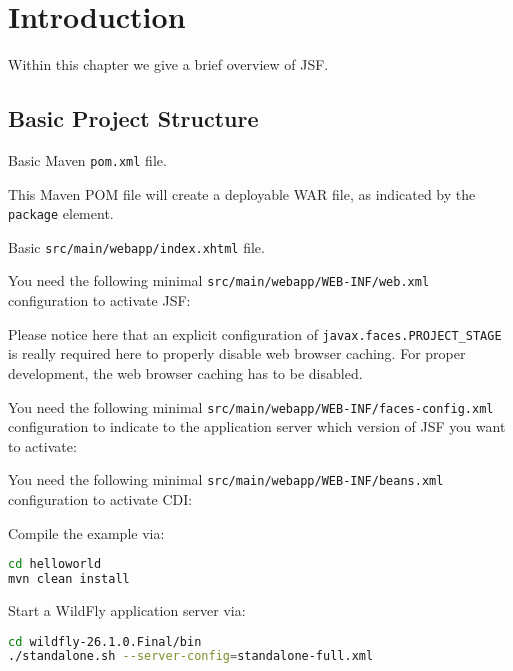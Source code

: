%

\chapter{Introduction}

Within this chapter we give a brief overview of JSF.

\section{Basic Project Structure}
Basic Maven \texttt{pom.xml} file.


This Maven POM file will create a deployable WAR file, as indicated by the \texttt{package} element.

Basic \texttt{src/main/webapp/index.xhtml} file.


You need the following minimal \texttt{src/main/webapp/WEB-INF/web.xml} configuration to activate JSF:


Please notice here that an explicit configuration of \texttt{javax.faces.PROJECT\_STAGE} is really required here to properly disable web browser caching.
For proper development, the web browser caching has to be disabled.

You need the following minimal \texttt{src/main/webapp/WEB-INF/faces-config.xml} configuration to indicate to the application server which version of JSF you want to activate:


You need the following minimal \texttt{src/main/webapp/WEB-INF/beans.xml} configuration to activate CDI:


Compile the example via:
\begin{lstlisting}[language=bash]
cd helloworld
mvn clean install
\end{lstlisting}

Start a WildFly application server via:
\begin{lstlisting}[language=bash]
cd wildfly-26.1.0.Final/bin
./standalone.sh --server-config=standalone-full.xml
\end{lstlisting}


